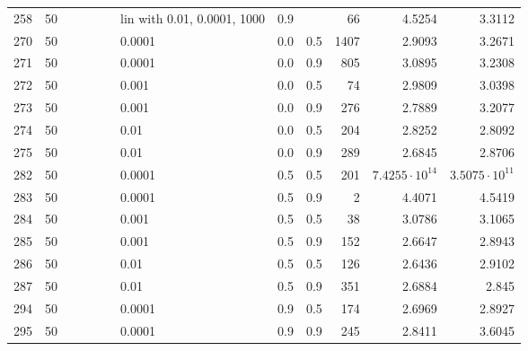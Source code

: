 \begin{longtable}{lrrrrrlrrrrr}
  258 &      50 &   &   &   &   & lin with 0.01, 0.0001, 1000 &      0.9 &        &      66 &                 4.5254 &                 3.3112 \\
  270 &      50 &   &   &   &   &                      0.0001 &      0.0 &    0.5 &    1407 &                 2.9093 &                 3.2671 \\
  271 &      50 &   &   &   &   &                      0.0001 &      0.0 &    0.9 &     805 &                 3.0895 &                 3.2308 \\
  272 &      50 &   &   &   &   &                       0.001 &      0.0 &    0.5 &      74 &                 2.9809 &                 3.0398 \\
  273 &      50 &   &   &   &   &                       0.001 &      0.0 &    0.9 &     276 &                 2.7889 &                 3.2077 \\
  274 &      50 &   &   &   &   &                        0.01 &      0.0 &    0.5 &     204 &                 2.8252 &                 2.8092 \\
  275 &      50 &   &   &   &   &                        0.01 &      0.0 &    0.9 &     289 &                 2.6845 &                 2.8706 \\
  282 &      50 &   &   &   &   &                      0.0001 &      0.5 &    0.5 &     201 &  $7.4255\cdot 10^{14}$ &  $3.5075\cdot 10^{11}$ \\
  283 &      50 &   &   &   &   &                      0.0001 &      0.5 &    0.9 &       2 &                 4.4071 &                 4.5419 \\
  284 &      50 &   &   &   &   &                       0.001 &      0.5 &    0.5 &      38 &                 3.0786 &                 3.1065 \\
  285 &      50 &   &   &   &   &                       0.001 &      0.5 &    0.9 &     152 &                 2.6647 &                 2.8943 \\
  286 &      50 &   &   &   &   &                        0.01 &      0.5 &    0.5 &     126 &                 2.6436 &                 2.9102 \\
  287 &      50 &   &   &   &   &                        0.01 &      0.5 &    0.9 &     351 &                 2.6884 &                  2.845 \\
  294 &      50 &   &   &   &   &                      0.0001 &      0.9 &    0.5 &     174 &                 2.6969 &                 2.8927 \\
  295 &      50 &   &   &   &   &                      0.0001 &      0.9 &    0.9 &     245 &                 2.8411 &                 3.6045 \\

\end{longtable}
